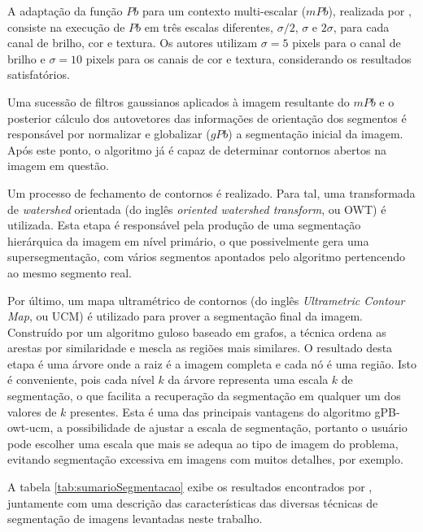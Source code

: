 A adaptação da função $Pb$ para um contexto multi-escalar ($mPb$), realizada por , consiste na execução de $Pb$ em três escalas diferentes, $\sigma/2$, $\sigma$ e $2\sigma$, para cada canal de brilho, cor e textura. Os autores utilizam $\sigma = 5$ pixels para o canal de brilho e $\sigma = 10$ pixels para os canais de cor e textura, considerando os resultados satisfatórios.

Uma sucessão de filtros gaussianos aplicados à imagem resultante do $mPb$ e o posterior cálculo dos autovetores das informações de orientação dos segmentos é responsável por normalizar e globalizar ($gPb$) a segmentação inicial da imagem. Após este ponto, o algoritmo já é capaz de determinar contornos abertos na imagem em questão.

Um processo de fechamento de contornos é realizado. Para tal, uma transformada de \textit{watershed} orientada (do inglês \textit{oriented watershed transform}, ou OWT) é utilizada. Esta etapa é responsável pela produção de uma segmentação hierárquica da imagem em nível primário, o que possivelmente gera uma supersegmentação, com vários segmentos apontados pelo algoritmo pertencendo ao mesmo segmento real.

Por último, um mapa ultramétrico de contornos (do inglês \textit{Ultrametric Contour Map}, ou UCM) é utilizado para prover a segmentação final da imagem. Construído por um algoritmo guloso baseado em grafos, a técnica ordena as arestas por similaridade e mescla as regiões mais similares. O resultado desta etapa é uma árvore onde a raiz é a imagem completa e cada nó é uma região. Isto é conveniente, pois cada nível $k$ da árvore representa uma escala $k$ de segmentação, o que facilita a recuperação da segmentação em qualquer um dos valores de $k$ presentes. Esta é uma das principais vantagens do algoritmo gPB-owt-ucm, a possibilidade de ajustar a escala de segmentação, portanto o usuário pode escolher uma escala que mais se adequa ao tipo de imagem do problema, evitando segmentação excessiva em imagens com muitos detalhes, por exemplo.

A tabela \ref{tab:sumarioSegmentacao} exibe os resultados encontrados por , juntamente com uma descrição das características das diversas técnicas de segmentação de imagens levantadas neste trabalho.

